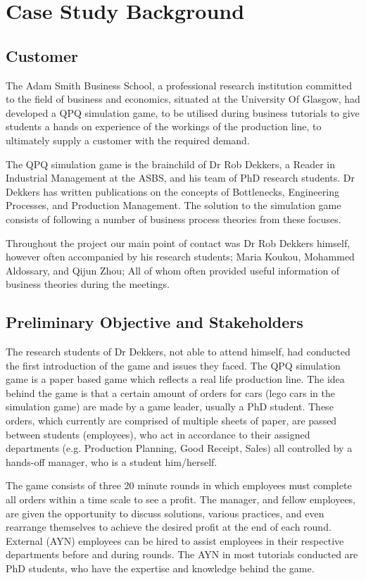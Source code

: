 \documentclass{l3proj}
\begin{document}
\section{Case Study Background}
\label{sec:casestudy}

\subsection{Customer}

The Adam Smith Business School, a professional research institution committed to the field of business and economics, situated at the University Of Glasgow, had developed a QPQ simulation game, to be utilised during business tutorials to give students a hands on experience of the workings of the production line, to ultimately supply a customer with the required demand.

The QPQ simulation game is the brainchild of Dr Rob Dekkers, a Reader in Industrial Management at the ASBS, and his team of PhD research students. Dr Dekkers has written publications on the concepts of Bottlenecks, Engineering Processes, and Production Management. The solution to the simulation game consists of following a number of business process theories from these focuses.

Throughout the project our main point of contact was Dr Rob Dekkers himself, however often accompanied by his research students; Maria Koukou, Mohammed Aldossary, and Qijun Zhou; All of whom often provided useful information of business theories during the meetings.


\subsection{Preliminary Objective and Stakeholders}
The research students of Dr Dekkers, not able to attend himself, had conducted the first introduction of the game and issues they faced. The QPQ simulation game is a paper based game which reflects a real life production line. The idea behind the game is that a certain amount of orders for cars (lego cars in the simulation game) are made by a game leader, usually a PhD student. These orders, which currently are comprised of multiple sheets of paper, are passed between students (employees), who act in accordance to their assigned departments (e.g. Production Planning, Good Receipt, Sales) all controlled by a hands-off manager, who is a student him/herself. 

The game consists of three 20 minute rounds in which employees must complete all orders within a time scale to see a profit. The manager, and fellow employees, are given the opportunity to discuss solutions, various practices, and even rearrange themselves to achieve the desired profit at the end of each round. External (AYN) employees can be hired to assist employees in their respective departments before and during rounds. The AYN in most tutorials conducted are PhD students, who have the expertise and knowledge behind the game.
\end{document}
